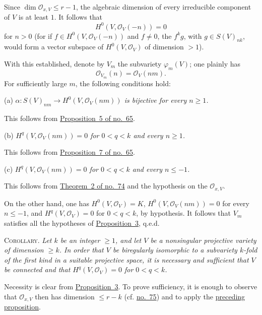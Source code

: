Since $\dim\mathcal O_{x,V}\leq r-1$, the algebraic dimension of every
irreducible component of $V$ is at least $1$. It follows that
\label{fac:III:5:no:77:formula:H0-negative}
\[
H^0(V,\mathcal O_V(-n))=0
\]
for $n>0$ (for if $f\in H^0(V,\mathcal O_V(-n))$ and $f\neq0$, the
$f^k g$, with $g\in S(V)_{nk}$, would form a vector subspace of
$H^0(V,\mathcal O_V)$ of dimension $>1$).

With this established, denote by $V_m$ the subvariety
$\varphi_m(V)$; one plainly has
\label{fac:III:5:no:77:formula:Veronese-twist}
\[
\mathcal O_{V_m}(n)=\mathcal O_V(nm).
\]
For sufficiently large $m$, the following conditions hold:

\label{fac:III:5:no:77:prop:4:condition:a}
(a) \textit{$\alpha:S(V)_{nm}\to H^0(V,\mathcal O_V(nm))$ is
bijective for every $n\geq1$.}

This follows from
\hyperref[fac:III:3:no:65:prop:5]{Proposition~5 of no.~65}.

\label{fac:III:5:no:77:prop:4:condition:b}
(b) \textit{$H^q(V,\mathcal O_V(nm))=0$ for $0<q<k$ and every
$n\geq1$.}

This follows from
\hyperref[fac:III:3:no:65:prop:7]{Proposition~7 of no.~65}.

\label{fac:III:5:no:77:prop:4:condition:c}
(c) \textit{$H^q(V,\mathcal O_V(nm))=0$ for $0<q<k$ and every
$n\leq-1$.}

This follows from
\hyperref[fac:III:5:no:74:thm:2]{Theorem~2 of no.~74} and the hypothesis
on the $\mathcal O_{x,V}$.

On the other hand, one has $H^0(V,\mathcal O_V)=K$,
$H^0(V,\mathcal O_V(nm))=0$ for every $n\leq-1$, and
$H^q(V,\mathcal O_V)=0$ for $0<q<k$, by hypothesis. It follows that
$V_m$ satisfies all the hypotheses of
\hyperref[fac:III:5:no:77:prop:3]{Proposition~3}, q.e.d.

\label{fac:III:5:no:77:cor:embedding}
\textsc{Corollary.} \textit{Let $k$ be an integer $\geq1$, and let $V$
be a nonsingular projective variety of dimension $\geq k$. In order
that $V$ be biregularly isomorphic to a subvariety $k$-fold of the
first kind in a suitable projective space, it is necessary and
sufficient that $V$ be connected and that
$H^q(V,\mathcal O_V)=0$ for $0<q<k$.}

Necessity is clear from
\hyperref[fac:III:5:no:77:prop:3]{Proposition~3}. To prove sufficiency, it is
enough to observe that $\mathcal O_{x,V}$ then has dimension
$\leq r-k$ (cf. \hyperref[fac:III:5:no:75]{no.~75}) and to apply the
\hyperref[fac:III:5:no:77:prop:4]{preceding proposition}.
